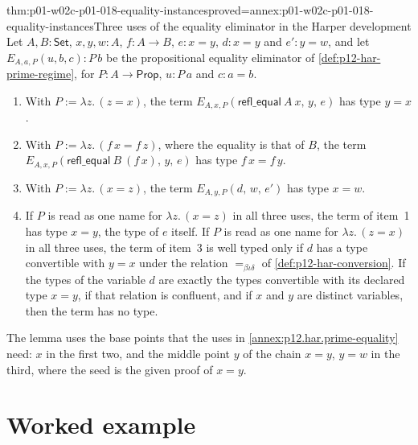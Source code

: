 \begin{hblemma}{thm:p01-w02c-p01-018-equality-instances}{proved=annex:p01-w02c-p01-018-equality-instances}{Three uses of the equality eliminator in the Harper development}
Let \(A,B:\mathsf{Set}\), \(x,y,w:A\), \(f:A\to B\), \(e:x=y\), \(d:x=y\)
and \(e':y=w\), and let \(E_{A,a,P}(u,b,c):P\,b\) be the propositional
equality eliminator of \cref{def:p12-har-prime-regime}, for
\(P:A\to\mathsf{Prop}\), \(u:P\,a\) and \(c:a=b\).
\begin{enumerate}
  \item With \(P:=\lambda z.\,(z=x)\), the term
  \(E_{A,x,P}(\mathsf{refl\_equal}\ A\ x,\,y,\,e)\) has type \(y=x\).
  \item With \(P:=\lambda z.\,(f\,x=f\,z)\), where the equality is that of
  \(B\), the term
  \(E_{A,x,P}(\mathsf{refl\_equal}\ B\ (f\,x),\,y,\,e)\) has type
  \(f\,x=f\,y\).
  \item With \(P:=\lambda z.\,(x=z)\), the term
  \(E_{A,y,P}(d,\,w,\,e')\) has type \(x=w\).
  \item If \(P\) is read as one name for \(\lambda z.\,(x=z)\) in all three
  uses, the term of item~1 has type \(x=y\), the type of \(e\) itself.
  If \(P\) is read as one name for \(\lambda z.\,(z=x)\) in all three
  uses, the term of item~3 is well typed only if \(d\) has a type
  convertible with \(y=x\) under the relation \(=_{\beta\iota\delta}\) of
  \cref{def:p12-har-conversion}.  If the types of the variable \(d\) are
  exactly the types convertible with its declared type \(x=y\), if that
  relation is confluent, and if \(x\) and \(y\) are distinct variables,
  then the term has no type.
\end{enumerate}
\end{hblemma}

The lemma uses the base points that the uses in
\cref{annex:p12.har.prime-equality} need: \(x\) in the first two, and the
middle point \(y\) of the chain \(x=y\), \(y=w\) in the third, where the
seed is the given proof of \(x=y\).

\section{Worked example}
\label{sec:p01-w02c-p01-018-worked}

